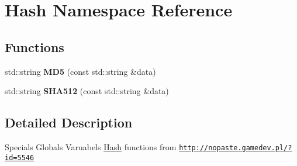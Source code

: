 \hypertarget{namespaceHash}{
\section{Hash Namespace Reference}
\label{namespaceHash}
}
\subsection*{Functions}
\begin{DoxyCompactItemize}
\item 
\hypertarget{namespaceHash_a7afbbfafc36ad2234ab868f3c1922025}{
std::string {\bfseries MD5} (const std::string \&data)}
\label{namespaceHash_a7afbbfafc36ad2234ab868f3c1922025}

\item 
\hypertarget{namespaceHash_ad2302a0ddd0cf8b6b023c0bd1483d162}{
std::string {\bfseries SHA512} (const std::string \&data)}
\label{namespaceHash_ad2302a0ddd0cf8b6b023c0bd1483d162}

\end{DoxyCompactItemize}


\subsection{Detailed Description}
Specials Globals Varuabels \hyperlink{namespaceHash}{Hash} functions from \href{http://nopaste.gamedev.pl/?id=5546}{\tt http://nopaste.gamedev.pl/?id=5546} 